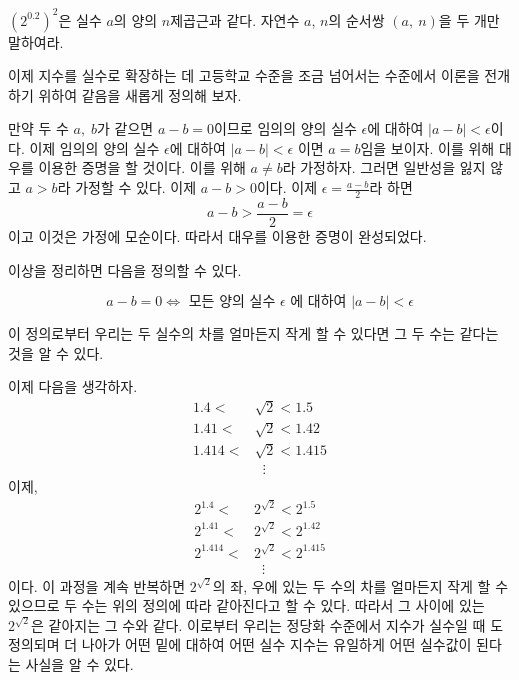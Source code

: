 \documentclass[11pt, a4paper]{book}
\begin{document}
 \begin{problem}
 	 $(2^{0.2})^{2}$은 실수 $a$의 양의 $n$제곱근과 같다. 자연수 $a$, $n$의 순서쌍 $(a,\:n)$을 두 개만 말하여라.
 \end{problem}

이제 지수를 실수로 확장하는 데 고등학교 수준을 조금 넘어서는 수준에서 이론을 전개하기 위하여 {\color{red}같음}을 새롭게 정의해 보자. 

만약 두 수 $a,\;b$가 같으면 $a-b=0$이므로 임의의 양의 실수 $\epsilon$에 대하여 $\vert a-b \vert < \epsilon$이다.  이제 임의의 양의 실수 $\epsilon$에 대하여 $\vert a-b \vert < \epsilon$
이면 $a=b$임을 보이자. 이를 위해 대우를 이용한 증명을 할 것이다. 이를 위해 $a \neq b$라 가정하자. 그러면 일반성을 잃지 않고 $a>b$라 가정할 수 있다. 이제 $a-b>0$이다. 이제 $\epsilon =\frac{a-b}{2}$라 하면 
\[
a-b > \frac{a-b}{2} =\epsilon
\]
이고 이것은 가정에 모순이다. 따라서 대우를 이용한 증명이 완성되었다. 

이상을 정리하면 다음을 정의할 수 있다.

\begin{definition}[$a=b$]\vspace{-1.2em}
	\begin{equation*} 
			a-b  = 0 \Leftrightarrow  \text{ 모든 양의 실수 } \epsilon \text { 에 대하여 } \vert a-b \vert < \epsilon
	\end{equation*}
\end{definition}

이 정의로부터 우리는 두 실수의 차를 얼마든지 작게 할 수 있다면 그 두 수는 같다는 것을 알 수 있다.

이제 다음을 생각하자.
\begin{align*}
	1.4 < &\sqrt{2}<1.5 \\
	1.41 <&\sqrt{2} <1.42 \\
	1.414 <  & \sqrt{2} <1.415 \\
	&\phantom{x}\vdots
\end{align*}
이제,
\begin{align*}
	2^{1.4} < &2^{\sqrt{2}}< 2^{1.5} \\
	2^{1.41} <& 2^{\sqrt{2}}< 2^{1.42} \\
	2^{1.414 }<  & 2^{\sqrt{2}} < 2^{1.415} \\
	&\phantom{x}\vdots
\end{align*}
이다. 이 과정을 계속 반복하면 $2^{\sqrt{2}}$의 좌, 우에 있는  두 수의 차를 얼마든지 작게 할 수 있으므로 두 수는 위의 정의에 따라 같아진다고 할 수 있다. 따라서 그 사이에 있는 $2^{\sqrt{2}}$은 같아지는 그 수와 같다. 이로부터 우리는 정당화 수준에서 지수가 실수일 때 도 정의되며 더 나아가 어떤 밑에 대하여 어떤 실수 지수는 유일하게 어떤 실수값이 된다는 사실을 알 수 있다.
\end{document}
